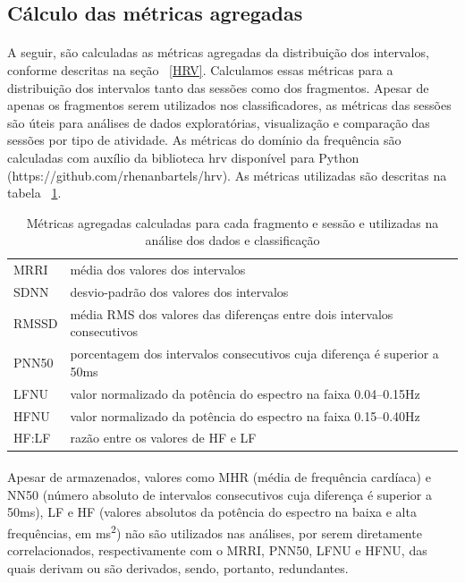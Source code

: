             
        \subsection{Cálculo das métricas agregadas}
        
            \paragraph{}A seguir, são calculadas as métricas agregadas da distribuição dos intervalos, conforme descritas na seção ~\ref{HRV}. Calculamos essas métricas para a distribuição dos intervalos tanto das sessões como dos fragmentos. Apesar de apenas os fragmentos serem utilizados nos classificadores, as métricas das sessões são úteis para análises de dados exploratórias, visualização e comparação das sessões por tipo de atividade. As métricas do domínio da frequência são calculadas com auxílio da biblioteca hrv disponível para Python (https://github.com/rhenanbartels/hrv). As métricas utilizadas são descritas na tabela ~\ref{feats}.
  
            \begin{table}[h!]
                \centering
                \begin{tabular}{ll}
                MRRI  & média dos valores dos intervalos                             \\
                SDNN  & desvio-padrão dos valores dos intervalos                     \\
                RMSSD & média RMS dos valores das diferenças entre dois intervalos consecutivos \\
                PNN50 & porcentagem dos intervalos consecutivos cuja diferença é superior a 50ms \\
                LFNU  & valor normalizado da potência do espectro na faixa 0.04–0.15Hz\\
                HFNU  & valor normalizado da potência do espectro na faixa 0.15–0.40Hz\\
                HF:LF & razão entre os valores de HF e LF
                \end{tabular}
                \caption{Métricas agregadas calculadas para cada fragmento e sessão e utilizadas na análise dos dados e classificação}
                \label{feats}
            \end{table}
            
            \paragraph{}Apesar de armazenados, valores como MHR (média de frequência cardíaca) e NN50 (número absoluto de intervalos consecutivos cuja diferença é superior a 50ms), LF e HF (valores absolutos da potência do espectro na baixa e alta frequências, em ms\textsuperscript{2}) não são utilizados nas análises, por serem diretamente correlacionados, respectivamente com o MRRI, PNN50, LFNU e HFNU, das quais derivam ou são derivados, sendo, portanto, redundantes. 
            
